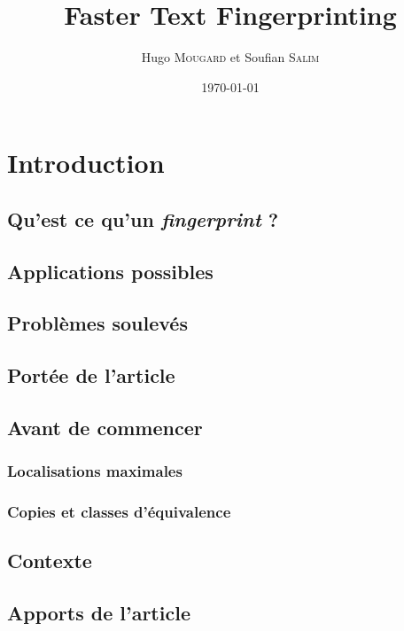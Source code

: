 \documentclass[a4paper,10pt]{article}
\title{Faster Text Fingerprinting}
\author{Hugo \textsc{Mougard} et Soufian \textsc{Salim}}
\date{\today}
\begin{document}
\maketitle

\tableofcontents

\section{Introduction}

\subsection{Qu'est ce qu'un \textit{fingerprint} ?}

\subsection{Applications possibles}

\subsection{Problèmes soulevés}

\subsection{Portée de l'article}

\subsection{Avant de commencer}

\subsubsection{Localisations maximales}

\subsubsection{Copies et classes d'équivalence}

\subsection{Contexte}

\subsection{Apports de l'article}
\end{document}
